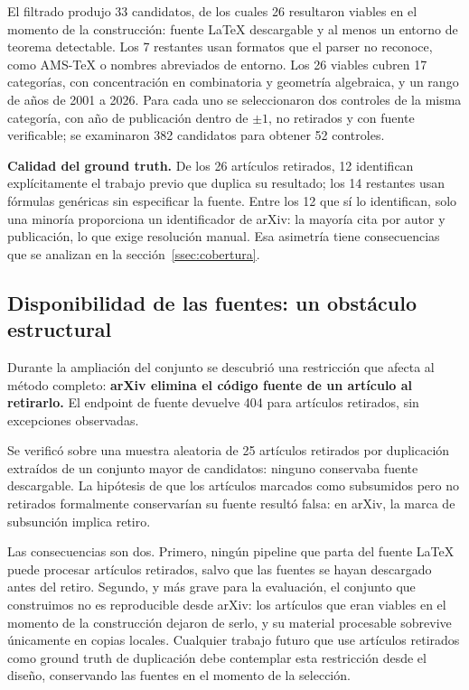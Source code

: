 \documentclass[12pt,a4paper]{article}
\theoremstyle{remark}
\begin{document}
El filtrado produjo 33 candidatos, de los cuales 26 resultaron viables en el momento de la construcción: fuente LaTeX descargable y al menos un entorno de teorema detectable. Los 7 restantes usan formatos que el parser no reconoce, como AMS-\TeX{} o nombres abreviados de entorno. Los 26 viables cubren 17 categorías, con concentración en combinatoria y geometría algebraica, y un rango de años de 2001 a 2026. Para cada uno se seleccionaron dos controles de la misma categoría, con año de publicación dentro de $\pm 1$, no retirados y con fuente verificable; se examinaron 382 candidatos para obtener 52 controles.

\textbf{Calidad del ground truth.} De los 26 artículos retirados, 12 identifican explícitamente el trabajo previo que duplica su resultado; los 14 restantes usan fórmulas genéricas sin especificar la fuente. Entre los 12 que sí lo identifican, solo una minoría proporciona un identificador de arXiv: la mayoría cita por autor y publicación, lo que exige resolución manual. Esa asimetría tiene consecuencias que se analizan en la sección~\ref{ssec:cobertura}.

\subsection{Disponibilidad de las fuentes: un obstáculo estructural}
\label{ssec:fuentes}

Durante la ampliación del conjunto se descubrió una restricción que afecta al método completo: \textbf{arXiv elimina el código fuente de un artículo al retirarlo.} El endpoint de fuente devuelve 404 para artículos retirados, sin excepciones observadas.

Se verificó sobre una muestra aleatoria de 25 artículos retirados por duplicación extraídos de un conjunto mayor de candidatos: ninguno conservaba fuente descargable. La hipótesis de que los artículos marcados como subsumidos pero no retirados formalmente conservarían su fuente resultó falsa: en arXiv, la marca de subsunción implica retiro.

Las consecuencias son dos. Primero, ningún pipeline que parta del fuente LaTeX puede procesar artículos retirados, salvo que las fuentes se hayan descargado antes del retiro. Segundo, y más grave para la evaluación, el conjunto que construimos no es reproducible desde arXiv: los artículos que eran viables en el momento de la construcción dejaron de serlo, y su material procesable sobrevive únicamente en copias locales. Cualquier trabajo futuro que use artículos retirados como ground truth de duplicación debe contemplar esta restricción desde el diseño, conservando las fuentes en el momento de la selección.
\end{document}
